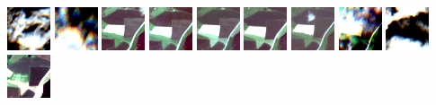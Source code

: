 \documentclass[%
  aspectratio=169,
  9pt,
ngerman,
  light,
  mathserif,
  professionalfont,
  affiliationintitlepagehead,
  titlegraphic,
   affiliation,
   navigationbar,
  progressbar,
]{beamer}
\begin{document}
\begin{frame}
	\includegraphics[width=\imagewidth]{images/activations/16494/x/x-10.png}
	\includegraphics[width=\imagewidth]{images/activations/16494/x/x-11.png}
	\includegraphics[width=\imagewidth]{images/activations/16494/x/x-12.png}
	\includegraphics[width=\imagewidth]{images/activations/16494/x/x-13.png}
	\includegraphics[width=\imagewidth]{images/activations/16494/x/x-14.png}
	\includegraphics[width=\imagewidth]{images/activations/16494/x/x-15.png}
	\includegraphics[width=\imagewidth]{images/activations/16494/x/x-16.png}
	\includegraphics[width=\imagewidth]{images/activations/16494/x/x-18.png}
	\includegraphics[width=\imagewidth]{images/activations/16494/x/x-19.png}
	\includegraphics[width=\imagewidth]{images/activations/16494/x/x-20.png}

\end{frame}
\end{document}
